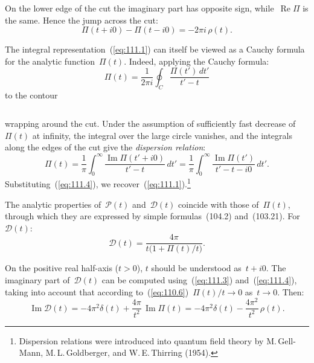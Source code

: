 On the lower edge of the cut the imaginary part has opposite sign, while~$\operatorname{Re}\Pi$ is the same. Hence the jump across the cut:
\begin{equation}
\Pi(t + i0) - \Pi(t - i0) = -2\pi i\,\rho(t).
\label{eq:111.5}
\end{equation}

The integral representation~(\ref{eq:111.1}) can itself be viewed as a Cauchy formula for the analytic function~$\Pi(t)$. Indeed, applying the Cauchy formula:
\begin{equation}
\Pi(t) = \frac{1}{2\pi i}\oint_C \frac{\Pi(t')\,dt'}{t' - t}
\label{eq:111.6}
\end{equation}
to the contour

\begin{equation}
\label{eq:111.7}
\end{equation}

\noindent wrapping around the cut. Under the assumption of sufficiently fast decrease of~$\Pi(t)$ at infinity, the integral over the large circle vanishes, and the integrals along the edges of the cut give the \emph{dispersion relation}:
\begin{equation}
\Pi(t) = \frac{1}{\pi}\int_0^\infty \frac{\operatorname{Im}\Pi(t' + i0)}{t' - t}\,dt' = \frac{1}{\pi}\int_0^\infty \frac{\operatorname{Im}\Pi(t')}{t' - t - i0}\,dt'.
\label{eq:111.8}
\end{equation}
Substituting~(\ref{eq:111.4}), we recover~(\ref{eq:111.1}).\footnote{Dispersion relations were introduced into quantum field theory by M.\,Gell-Mann, M.\,L.\,Goldberger, and W.\,E.\,Thirring (1954).}


The analytic properties of~$\mathcal{P}(t)$ and~$\mathcal{D}(t)$ coincide with those of~$\Pi(t)$, through which they are expressed by simple formulas~(104.2) and~(103.21). For~$\mathcal{D}(t)$:
\begin{equation}
\mathcal{D}(t) = \frac{4\pi}{t\bigl(1 + \Pi(t)/t\bigr)}.
\label{eq:111.9}
\end{equation}

On the positive real half-axis ($t > 0$), $t$ should be understood as~$t + i0$. The imaginary part of~$\mathcal{D}(t)$ can be computed using~(\ref{eq:111.3}) and~(\ref{eq:111.4}), taking into account that according to~(\ref{eq:110.6})~$\Pi(t)/t \to 0$ as~$t \to 0$. Then:
\begin{equation}
\operatorname{Im}\mathcal{D}(t) = -4\pi^2\delta(t) + \frac{4\pi}{t^2}\,\operatorname{Im}\Pi(t) = -4\pi^2\delta(t) - \frac{4\pi^2}{t^2}\,\rho(t).
\label{eq:111.10}
\end{equation}

